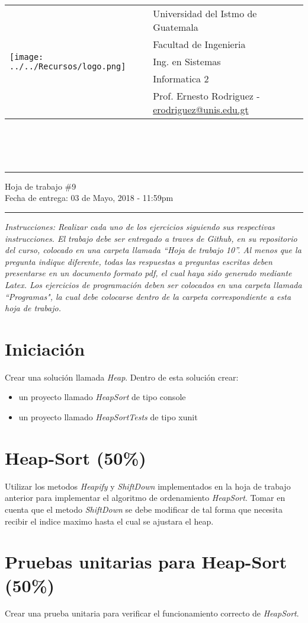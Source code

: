 \documentclass{article}
\newcommand{\horrule}[1]{\rule{\linewidth}{#1}}
\begin{document}
\begin{tabular}{l l}
\multirow{5}{*}{\texttt{[image: ../../Recursos/logo.png]}} & Universidad del Istmo de Guatemala \\
 & Facultad de Ingenieria \\
 & Ing. en Sistemas \\
 & Informatica 2 \\
 & Prof. Ernesto Rodriguez - \href{mailto:erodriguez@unis.edu.gt}{erodriguez@unis.edu.gt} \\
\end{tabular}
\\\\\\

\begin{center}
        \horrule{0.5pt}
        \huge{Hoja de trabajo \#9} \\
        \large{Fecha de entrega: 03 de Mayo, 2018 - 11:59pm} \\
        \horrule{1pt}
\end{center}
\emph{Instrucciones: Realizar cada uno de los ejercicios siguiendo sus respectivas
instrucciones. El trabajo debe ser entregado a traves de Github, en su repositorio del curso, colocado en una carpeta llamada ``Hoja de trabajo 10''.
Al menos que la pregunta indique diferente, todas las respuestas a preguntas escritas deben presentarse en
un documento formato pdf, el cual haya sido generado mediante Latex. Los ejercicios de programaci\'on deben ser colocados en una carpeta
llamada ``Programas", la cual debe colocarse dentro de la carpeta correspondiente a esta hoja de trabajo.}

\section*{Iniciaci\'on}

Crear una soluci\'on llamada \emph{Heap}. Dentro de esta soluci\'on crear:
\begin{itemize}
        \item{un proyecto llamado \emph{HeapSort} de tipo console}
        \item{un proyecto llamado \emph{HeapSortTests} de tipo xunit}
\end{itemize}

\section*{Heap-Sort (50\%)}
Utilizar los metodos \emph{Heapify} y \emph{ShiftDown} implementados en la hoja de trabajo anterior para implementar el
algoritmo de ordenamiento \emph{HeapSort}. Tomar en cuenta que el metodo \emph{ShiftDown} se debe modificar de tal forma
que necesita recibir el indice maximo hasta el cual se ajustara el heap.

\section*{Pruebas unitarias para Heap-Sort (50\%)}
Crear una prueba unitaria para verificar el funcionamiento correcto de \emph{HeapSort}.



\end{document}
